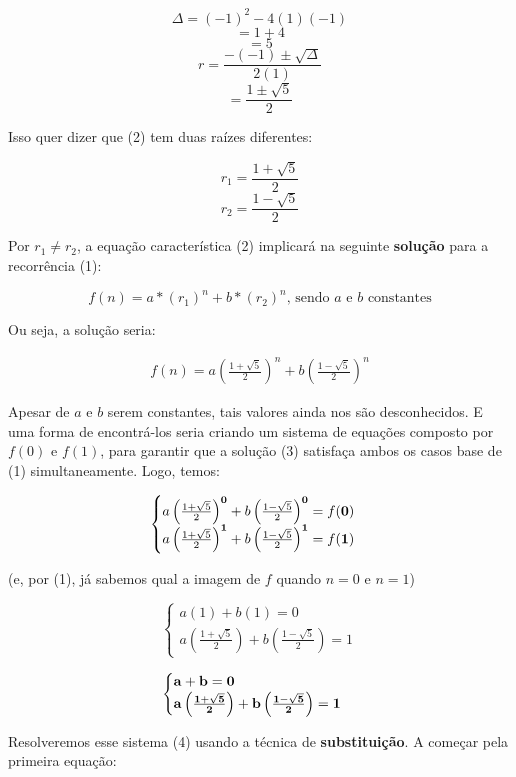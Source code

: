 \documentclass[12pt]{article}
\begin{document}
$$
\Delta = (-1)^2 - 4(1)(-1)
$$
$$
= 1 + 4
$$
$$
= 5
$$
$$
r = \frac{-(-1) \pm\sqrt{\Delta}}{2(1)}
$$
$$
= \frac{1 \pm\sqrt{5}}{2}
$$

Isso quer dizer que (2) tem duas raízes diferentes:

$$
r_1 = \frac{1 + \sqrt{5}}{2}
$$
$$
r_2 = \frac{1 - \sqrt{5}}{2}
$$


Por $r_1\neq r_2$, a equação característica (2) implicará
na seguinte {\bf solução} para a recorrência (1):

$$
f(n) = a*(r_1)^n +b*(r_2)^n
\text{, sendo $a$ e $b$ constantes}
$$

Ou seja, a solução seria:

\begin{align}
f(n) =
a\left( \frac{1 + \sqrt{5}}{2} \right)^n
+
b\left( \frac{1 - \sqrt{5}}{2} \right)^n
\end{align}

Apesar de $a$ e $b$ serem constantes, tais valores ainda nos
são desconhecidos. E uma forma de encontrá-los seria criando
um sistema de equações composto por $f(0)$ e $f(1)$,
para garantir que a solução (3) satisfaça ambos os casos base
de (1) simultaneamente.
Logo, temos:

$$
\begin{cases}
a\left( \frac{1 + \sqrt{5}}{2} \right)^{\bf 0}
+
b\left( \frac{1 - \sqrt{5}}{2} \right)^{\bf 0}
=
f({\bf 0})
\\
a\left( \frac{1 + \sqrt{5}}{2} \right)^{\bf 1}
+
b\left( \frac{1 - \sqrt{5}}{2} \right)^{\bf 1}
=
f({\bf 1})
\end{cases}
$$

(e, por (1), já sabemos qual a imagem de $f$ quando $n=0$ e $n=1$)

$$
\begin{cases}
a(1)
+
b(1)
=
0
\\
a\left( \frac{1 + \sqrt{5}}{2} \right)
+
b\left( \frac{1 - \sqrt{5}}{2} \right)
=
1
\end{cases}
$$

\begin{align}
\begin{cases}
{\bf a + b = 0}
\\
{\bf a\left( \frac{1 + \sqrt{5}}{2} \right)
+
b\left( \frac{1 - \sqrt{5}}{2} \right)
=
1}
\end{cases}
\end{align}

Resolveremos esse sistema (4) usando a técnica de {\bf substituição}.
A começar pela primeira equação:
\end{document}
